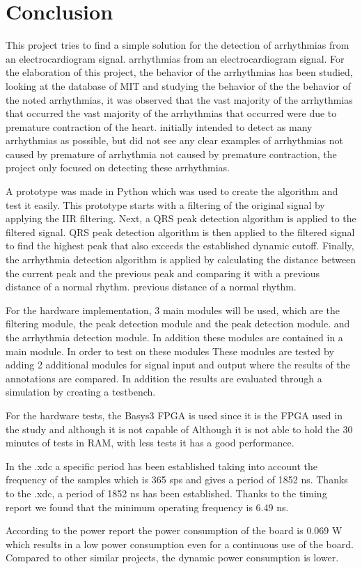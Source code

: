 \chapter*{Conclusion}

This project tries to find a simple solution for the detection of arrhythmias from an electrocardiogram signal. 
arrhythmias from an electrocardiogram signal. For the elaboration of this project, 
the behavior of the arrhythmias has been studied, looking at the database of MIT and studying the behavior of the
the behavior of the noted arrhythmias, it was observed that the vast majority of the arrhythmias that occurred 
the vast majority of the arrhythmias that occurred were due to premature contraction of the heart.
initially intended to detect as many arrhythmias as possible, but did not see any clear examples of arrhythmias not caused by premature
of arrhythmia not caused by premature contraction, the project only focused on detecting these arrhythmias.

A prototype was made in Python which was used to create the algorithm and test it easily. This prototype starts
with a filtering of the original signal by applying the IIR filtering. Next, a QRS peak detection algorithm is applied to the filtered signal. 
QRS peak detection algorithm is then applied to the filtered signal to find the highest peak that also exceeds the established dynamic cutoff.
Finally, the arrhythmia detection algorithm is applied by calculating the distance between the current peak and the previous peak and comparing it with a previous distance of a normal rhythm.
previous distance of a normal rhythm.

For the hardware implementation, 3 main modules will be used, which are the filtering module, the peak detection module and the peak detection module. 
and the arrhythmia detection module. In addition these modules are contained in a main module. In order to test on these modules
These modules are tested by adding 2 additional modules for signal input and output where the results of the annotations are compared. In addition 
the results are evaluated through a simulation by creating a testbench.

For the hardware tests, the Basys3 FPGA is used since it is the FPGA used in the study and although it is not capable of 
Although it is not able to hold the 30 minutes of tests in RAM, with less tests it has a good performance.

In the .xdc a specific period has been established taking into account the frequency of the samples which is 365 sps and gives a period of 1852 ns. Thanks to the .xdc, a period of 1852 ns has been established. 
Thanks to the timing report we found that the minimum operating frequency is 6.49 ns.

According to the power report the power consumption of the board is 0.069 W which results in a low power consumption even for a continuous use of the board.
Compared to other similar projects, the dynamic power consumption is lower.
